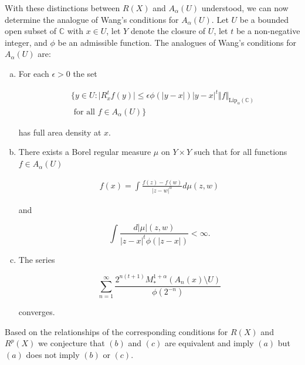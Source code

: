 \documentclass{article}
\theoremstyle{definition}
\begin{document}
With these distinctions between $R(X)$ and $A_{\alpha}(U)$ understood, we can now determine the analogue of Wang's conditions for $A_\alpha(U)$. Let $U$ be a bounded open subset of $\mathbb C$ with $x \in U$, let $Y$ denote the closure of $U$, let $t$ be a non-negative integer, and $\phi$ be an admissible function. The analogues of Wang's conditions for $A_\alpha(U)$ are:

\begin{enumerate}[(a)]
    \item For each $\epsilon >0 $ the set 
    
    \begin{align*}
   & \{y\in U: \vert R_x^t f(y) \vert \leq \epsilon \phi(\vert y-x \vert)\vert y-x \vert^t \Vert f \Vert_{\text{Lip}_\alpha(\mathbb C)} \\ &\text{ for all }  f \in A_{\alpha}(U)\}
    \end{align*}
    
 \noindent has full area density at $x$.
    
    \item There exists a Borel regular measure $\mu$ on $Y \times Y$ such that for all functions $f \in A_{\alpha}(U)$

    \begin{align*}
        f(x) = \int \frac{f(z)-f(w)}{|z-w|^{\alpha}} d\mu(z,w) 
    \end{align*}
    
    \noindent and 
    
    \begin{equation*} 
    \int \dfrac{d |\mu|(z,w)}{\vert z-x \vert^t\phi(\vert z-x \vert)} < \infty.
    \end{equation*}
    
    \item The series 
    
    \begin{equation*}
        \sum_{n=1}^{\infty} \dfrac{2^{n(t+1)} M_*^{1+\alpha}(A_n(x) \setminus U)}{\phi(2^{-n})} 
    \end{equation*}
    
 \noindent converges.
    
\end{enumerate}

\noindent Based on the relationships of the corresponding conditions for $R(X)$ and $R^p(X)$ we conjecture that $(b)$ and $(c)$ are equivalent and imply $(a)$ but $(a)$ does not imply $(b)$ or $(c)$. 
\end{document}
